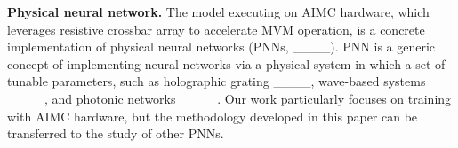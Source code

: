\textbf{Physical neural network.}
The model executing on AIMC hardware, which leverages resistive crossbar array to accelerate MVM operation, is a concrete implementation of physical neural networks (PNNs, ____). 
PNN is a generic concept of implementing neural networks via a physical system in which a set of tunable parameters, such as holographic grating ____, wave-based systems ____, and photonic networks ____. Our work particularly focuses on training with AIMC hardware, but the methodology developed in this paper can be transferred to the study of other PNNs.